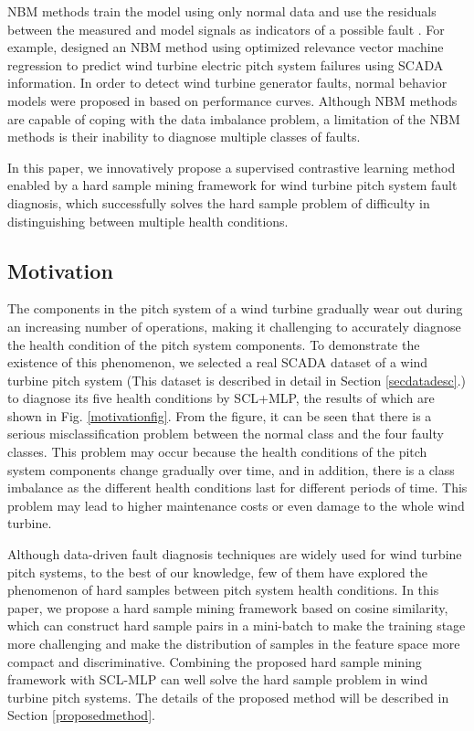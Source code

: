 \documentclass[lettersize,journal]{IEEEtran}
\begin{document}
NBM methods train the model using only normal data and use the residuals between the measured and model signals as indicators of a possible fault \cite{tautz2017using}. For example, \citet{wei2019wind} designed an NBM method using optimized relevance vector machine regression to predict wind turbine electric pitch system failures using SCADA information. In order to detect wind turbine generator faults, normal behavior models were proposed in \cite{bi2017detection} based on performance curves. Although NBM methods are capable of coping with the data imbalance problem, a limitation of the NBM methods is their inability to diagnose multiple classes of faults.

In this paper, we innovatively propose a supervised contrastive learning method enabled by a hard sample mining framework for wind turbine pitch system fault diagnosis, which successfully solves the hard sample problem of difficulty in distinguishing between multiple health conditions.

\subsection{Motivation}%
The components in the pitch system of a wind turbine gradually wear out during an increasing number of operations, making it challenging to accurately diagnose the health condition of the pitch system components. 
To demonstrate the existence of this phenomenon, we selected a real SCADA dataset of a wind turbine pitch system (This dataset is described in detail in Section \ref{secdatadesc}.) to diagnose its five health conditions by SCL+MLP, the results of which are shown in Fig. \ref{motivationfig}. 
From the figure, it can be seen that there is a serious misclassification problem between the normal class and the four faulty classes. This problem may occur because the health conditions of the pitch system components change gradually over time, and in addition, there is a class imbalance as the different health conditions last for different periods of time. This problem may lead to higher maintenance costs or even damage to the whole wind turbine.

Although data-driven fault diagnosis techniques are widely used for wind turbine pitch systems, to the best of our knowledge, few of them have explored the phenomenon of hard samples between pitch system health conditions. In this paper, we propose a hard sample mining framework based on cosine similarity, which can construct hard sample pairs in a mini-batch to make the training stage more challenging and make the distribution of samples in the feature space more compact and discriminative. Combining the proposed hard sample mining framework with SCL-MLP can well solve the hard sample problem in wind turbine pitch systems. The details of the proposed method will be described in Section \ref{proposedmethod}.
\end{document}
